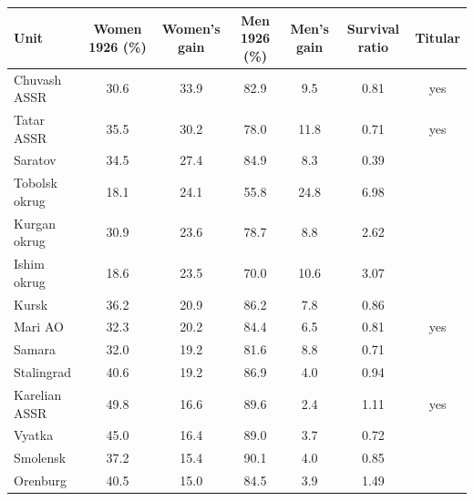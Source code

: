\begin{tabular}{lcccccc}
\toprule
Unit & Women 1926 (\%) & Women's gain & Men 1926 (\%) & Men's gain & Survival ratio & Titular \\
\midrule
Chuvash ASSR & 30.6 & 33.9 & 82.9 & 9.5 & 0.81 & yes \\
Tatar ASSR & 35.5 & 30.2 & 78.0 & 11.8 & 0.71 & yes \\
Saratov & 34.5 & 27.4 & 84.9 & 8.3 & 0.39 &  \\
Tobolsk okrug & 18.1 & 24.1 & 55.8 & 24.8 & 6.98 &  \\
Kurgan okrug & 30.9 & 23.6 & 78.7 & 8.8 & 2.62 &  \\
Ishim okrug & 18.6 & 23.5 & 70.0 & 10.6 & 3.07 &  \\
Kursk & 36.2 & 20.9 & 86.2 & 7.8 & 0.86 &  \\
Mari AO & 32.3 & 20.2 & 84.4 & 6.5 & 0.81 & yes \\
Samara & 32.0 & 19.2 & 81.6 & 8.8 & 0.71 &  \\
Stalingrad & 40.6 & 19.2 & 86.9 & 4.0 & 0.94 &  \\
Karelian ASSR & 49.8 & 16.6 & 89.6 & 2.4 & 1.11 & yes \\
Vyatka & 45.0 & 16.4 & 89.0 & 3.7 & 0.72 &  \\
Smolensk & 37.2 & 15.4 & 90.1 & 4.0 & 0.85 &  \\
Orenburg & 40.5 & 15.0 & 84.5 & 3.9 & 1.49 &  \\
\bottomrule
\end{tabular}
